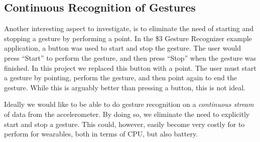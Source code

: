 \subsection{Continuous Recognition of Gestures}

Another interesting aspect to investigate, 
is to eliminate the need of starting and stopping a gesture by performing a point. 
In the \$3 Gesture Recognizer example application, 
a button was used to start and stop the gesture. 
The user would press ``Start'' to perform the gesture, 
and then press ``Stop'' when the gesture was finished. 
In this project we replaced this button with a point. 
The user must start a gesture by pointing, 
perform the gesture, 
and then point again to end the gesture. 
While this is arguably better than pressing a button, 
this is not ideal.

Ideally we would like to be able to do gesture recognition on a \emph{continuous stream} of data from the accelerometer. 
By doing so, we eliminate the need to explicitly start and stop a gesture.
This could, however, easily become very costly for to perform for wearables,
both in terms of CPU, but also battery.


